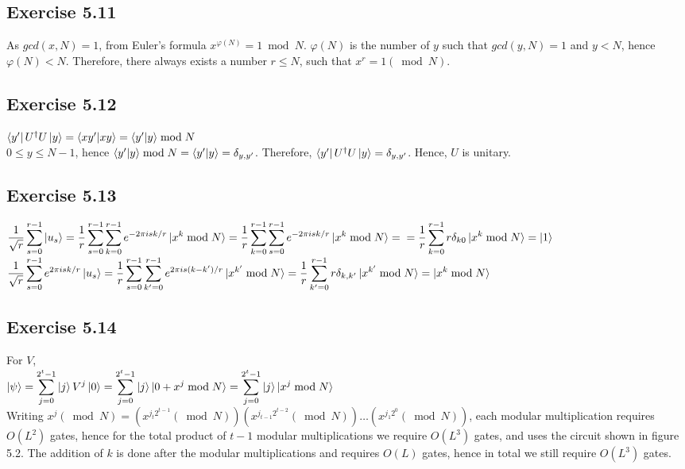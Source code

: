\documentclass[a4paper,12pt]{article}
\begin{document}
\subsection*{Exercise 5.11}
As $gcd(x, N)=1$, from Euler's formula $x^{\varphi(N)}=1\bmod N$. $\varphi(N)$ is the number
of $y$ such that $gcd(y,N)=1$ and $y<N$, hence $\varphi(N)<N$. Therefore, there always exists a
number $r\leq N$, such that $x^r=1(\bmod N)$.
\subsection*{Exercise 5.12}
$\bra{y^\prime}U^\dagger U\ket{y}=\braket{xy^\prime|xy}=\braket{y^\prime|y}\bmod N$\\
$0\leq y\leq N-1$, hence $\braket{y^\prime|y}\bmod N=\braket{y^\prime|y}=\delta_{y,y^\prime}$. Therefore,
$\bra{y^\prime}U^\dagger U\ket{y}=\delta_{y,y^\prime}$.
Hence, $U$ is unitary.
\subsection*{Exercise 5.13}
$\displaystyle\frac{1}{\sqrt{r}}\displaystyle\sum_{s=0}^{r-1}\ket{u_s}=
\frac{1}{r}\displaystyle\sum_{s=0}^{r-1}\sum_{k=0}^{r-1}e^{-2\pi isk/r}\ket{x^k\bmod N}=
\frac{1}{r}\displaystyle\sum_{k=0}^{r-1}\sum_{s=0}^{r-1}e^{-2\pi isk/r}\ket{x^k\bmod N}=\\
=\frac{1}{r}\displaystyle\sum_{k=0}^{r-1}r\delta_{k0}\ket{x^k\bmod N}=\ket{1}$\\
$\displaystyle\frac{1}{\sqrt{r}}\displaystyle\sum_{s=0}^{r-1}e^{2\pi isk/r}\ket{u_s}=
\frac{1}{r}\displaystyle\sum_{s=0}^{r-1}\sum_{k^\prime=0}^{r-1}
e^{2\pi is(k-k^\prime)/r}\ket{x^{k^\prime}\bmod N}=
\frac{1}{r}\displaystyle\sum_{k^\prime=0}^{r-1}r\delta_{k,k^\prime}\ket{x^{k^\prime}\bmod N}=
\ket{x^k\bmod N}$
\subsection*{Exercise 5.14}
For $V$,\\
$\ket{\psi}=\displaystyle\sum_{j=0}^{2^t-1}\ket{j}V^j\ket{0}=
\displaystyle\sum_{j=0}^{2^t-1}\ket{j}\ket{0+x^j\bmod N}=
\displaystyle\sum_{j=0}^{2^t-1}\ket{j}\ket{x^j\bmod N}$\\
Writing $x^j(\bmod N)=(x^{j_t{2^{t-1}}}(\bmod N))(x^{j_{t-1}{2^{t-2}}}(\bmod N))
\ldots (x^{j_1{2^0}}(\bmod N))$, each modular multiplication requires $O(L^2)$ gates, hence
for the total product of $t-1$ modular multiplications we require $O(L^3)$ gates, and uses the circuit
shown in figure 5.2. The addition of $k$ is done after the modular 
multiplications and requires $O(L)$ gates, hence in total we still require $O(L^3)$ gates.
\end{document}
